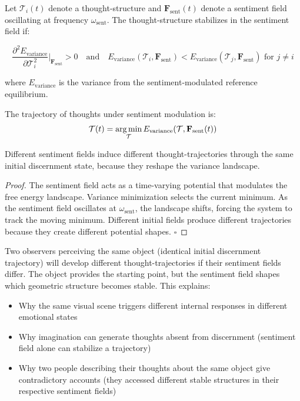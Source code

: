 \begin{theorem}
\label{thm:thought-stability}
Let $\mathcal{T}_i(t)$ denote a thought-structure and $\mathbf{F}_{\text{sent}}(t)$ denote a sentiment field oscillating at frequency $\omega_{\text{sent}}$. The thought-structure stabilizes in the sentiment field if:

\begin{equation}
\frac{\partial^2 E_{\text{variance}}}{\partial \mathcal{T}_i^2}\bigg|_{\mathbf{F}_{\text{sent}}} > 0 \quad \text{and} \quad E_{\text{variance}}(\mathcal{T}_i, \mathbf{F}_{\text{sent}}) < E_{\text{variance}}(\mathcal{T}_j, \mathbf{F}_{\text{sent}}) \text{ for } j \neq i
\end{equation}

where $E_{\text{variance}}$ is the variance from the sentiment-modulated reference equilibrium.

The trajectory of thoughts under sentiment modulation is:
$$\mathcal{T}(t) = \operatorname*{arg\,min}_{\mathcal{T}} E_{\text{variance}}(\mathcal{T}, \mathbf{F}_{\text{sent}}(t))$$

Different sentiment fields induce different thought-trajectories through the same initial discernment state, because they reshape the variance landscape.
\end{theorem}

\begin{proof}
The sentiment field acts as a time-varying potential that modulates the free energy landscape. Variance minimization selects the current minimum. As the sentiment field oscillates at $\omega_{\text{sent}}$, the landscape shifts, forcing the system to track the moving minimum. Different initial fields produce different trajectories because they create different potential shapes. $\square$
\end{proof}

\begin{remark}
Two observers perceiving the same object (identical initial discernment trajectory) will develop different thought-trajectories if their sentiment fields differ. The object provides the starting point, but the sentiment field shapes which geometric structure becomes stable. This explains:

\begin{itemize}
\item Why the same visual scene triggers different internal responses in different emotional states
\item Why imagination can generate thoughts absent from discernment (sentiment field alone can stabilize a trajectory)
\item Why two people describing their thoughts about the same object give contradictory accounts (they accessed different stable structures in their respective sentiment fields)
\end{itemize}
\end{remark}

